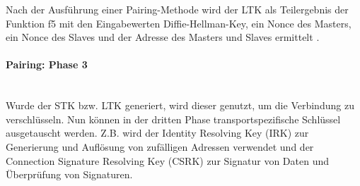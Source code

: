 Nach der Ausführung einer Pairing-Methode wird der LTK als Teilergebnis der Funktion f5 \cite{BtSpec4.2_2292-2293} 
mit den Eingabewerten Diffie-Hellman-Key, ein Nonce des Masters, ein Nonce des Slaves und der Adresse des Masters und Slaves ermittelt \cite{BtSpec4.2_2314}.

\paragraph{Pairing: Phase 3} \mbox{} \vspace{0.2cm} \\
Wurde der STK bzw. LTK generiert, wird dieser genutzt, um die Verbindung zu verschlüsseln. Nun können in der dritten Phase transportspezifische Schlüssel ausgetauscht werden. Z.B. wird der Identity Resolving Key (IRK) zur Generierung und Auflösung von zufälligen Adressen verwendet und der Connection Signature Resolving Key (CSRK) zur Signatur von Daten und Überprüfung von Signaturen.




